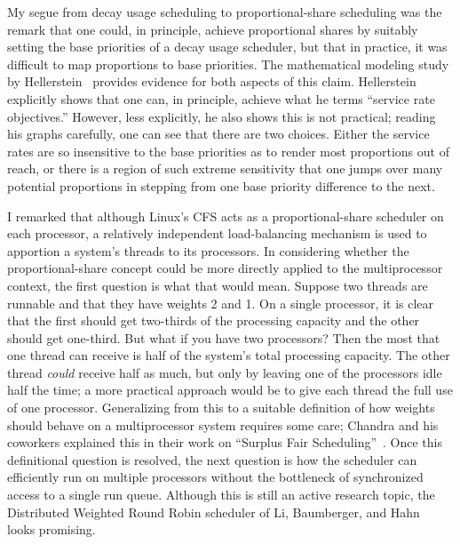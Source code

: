 My segue from decay usage scheduling to proportional-share scheduling
was the remark that one could, in principle, achieve proportional
shares by suitably setting the base priorities of a decay usage
scheduler, but that in practice, it was difficult to map proportions
to base priorities.  The mathematical modeling study by
Hellerstein~\cite{max978} provides evidence for both aspects of this
claim.  Hellerstein explicitly shows that one can, in principle,
achieve what he terms ``service rate objectives.''  However, less
explicitly, he also shows this is not practical; reading his graphs
carefully, one can see that there are two choices.  Either the service
rates are so insensitive to the base priorities as to render most
proportions out of reach, or there is a region of such extreme
sensitivity that one jumps over many potential proportions in stepping
from one base priority difference to the next.

I remarked that although Linux's CFS acts as a proportional-share
scheduler on each processor, a relatively independent load-balancing
mechanism is used to apportion a system's threads to its processors.
In considering whether the proportional-share concept could be more
directly applied to the multiprocessor context, the first question is
what that would mean.  Suppose two threads are runnable and that they
have weights 2 and 1.  On a single processor, it is clear that the
first should get two-thirds of the processing capacity and the other
should get one-third.  But what if you have two processors?  Then
the most that one thread can receive is half of the system's total
processing capacity.  The other thread \textit{could} receive half as much, but only by leaving one of the processors idle half the time; a more practical approach would be to give each thread the full use of one processor.  Generalizing from this to a suitable definition of how weights should behave on a multiprocessor system requires some care; Chandra
and his coworkers explained this in their work on ``Surplus Fair Scheduling''~\cite{max1191}.  Once this definitional
question is resolved, the next question is how the scheduler can efficiently run on multiple processors without the
bottleneck of synchronized access to a single run queue.  Although this is still an active research topic,
the Distributed Weighted Round Robin scheduler of Li, Baumberger, and Hahn~\cite{max1192} looks promising.

